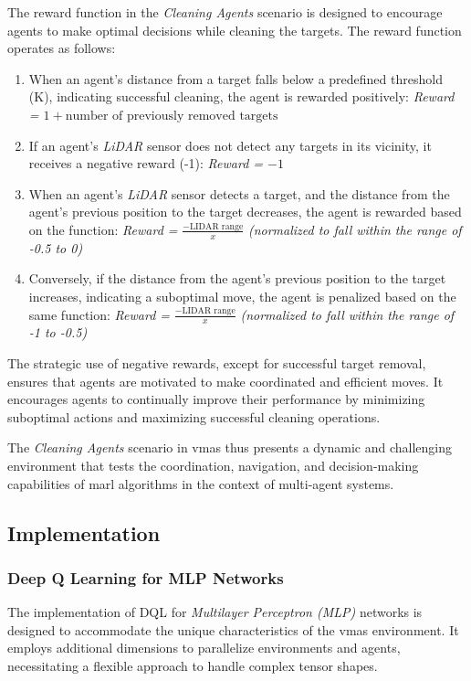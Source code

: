 \documentclass[12pt,a4paper,openright,twoside]{book}
\begin{document}
The reward function in the \emph{Cleaning Agents} scenario is designed to encourage agents to make optimal decisions while cleaning the targets. The reward function operates as follows:
\begin{enumerate}
  \item When an agent's distance from a target falls below a predefined threshold (K), indicating successful cleaning, the agent is rewarded positively:
  \emph{Reward = $1 + \text{number of previously removed targets}$}
  \item If an agent's \emph{LiDAR} sensor does not detect any targets in its vicinity, it receives a negative reward (-1):
  \emph{Reward = $-1$}
  \item When an agent's \emph{LiDAR} sensor detects a target, and the distance from the agent's previous position to the target decreases, the agent is rewarded based on the function:
  \emph{Reward = }$\frac{-\text{LIDAR range}}{x}$ \emph{(normalized to fall within the range of -0.5 to 0)}
  \item Conversely, if the distance from the agent's previous position to the target increases, indicating a suboptimal move, the agent is penalized based on the same function:
  \emph{Reward = }$\frac{-\text{LIDAR range}}{x}$ \emph{(normalized to fall within the range of -1 to -0.5)}
\end{enumerate}
The strategic use of negative rewards, except for successful target removal, ensures that agents are motivated to make coordinated and efficient moves. It encourages agents to continually improve their performance by minimizing suboptimal actions and maximizing successful cleaning operations.

The \emph{Cleaning Agents} scenario in \ac{vmas} thus presents a dynamic and challenging environment that tests the coordination, navigation, and decision-making capabilities of \ac{marl} algorithms in the context of multi-agent systems.

\subsection{Implementation}

\subsubsection{Deep Q Learning for MLP Networks}

The implementation of DQL for \emph{Multilayer Perceptron (MLP)} networks is designed to accommodate the unique 
characteristics of the \acf{vmas} environment. It employs additional dimensions to parallelize 
environments and agents, necessitating a flexible approach to handle complex tensor shapes.
\end{document}
